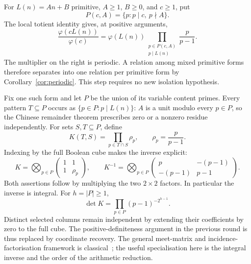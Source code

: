 \documentclass[11pt,a4paper]{article}
\theoremstyle{definition}\newtheorem{definition}[theorem]{Definition}
\theoremstyle{remark}\newtheorem*{remark}{Remark}
\newcommand{\ph}{\varphi}\newcommand{\Span}{\operatorname{span}}\newcommand{\ord}{\operatorname{ord}}
\begin{document}
For $L(n)=An+B$ primitive, $A\ge1$, $B\ge0$, and $c\ge1$, put
\[
 P(c,A)=\{p:p\mid c,\ p\nmid A\}.
\]
The local totient identity gives, at positive arguments,
\begin{equation}\label{eq:content}
 \frac{\ph(cL(n))}{\ph(c)}
 =\ph(L(n))\prod_{\substack{p\in P(c,A)\\p\mid L(n)}}\frac p{p-1}.
\end{equation}
The multiplier on the right is periodic. A relation among mixed primitive
forms therefore separates into one relation per primitive form by
Corollary~\ref{cor:periodic}. This step requires no new isolation hypothesis.

Fix one such form and let $P$ be the union of its variable content primes.
Every pattern $T\subseteq P$ occurs as $\{p\in P:p\mid L(n)\}$: $A$ is a unit
modulo every $p\in P$, so the Chinese remainder theorem prescribes zero or a
nonzero residue independently. For sets $S,T\subseteq P$, define
\[
 K(T,S)=\prod_{p\in T\cap S}\rho_p,\qquad \rho_p=\frac p{p-1}.
\]
Indexing by the full Boolean cube makes the inverse explicit:
\begin{equation}\label{eq:tensor}
 K=\bigotimes_{p\in P}
 \begin{pmatrix}1&1\\1&\rho_p\end{pmatrix},\qquad
 K^{-1}=\bigotimes_{p\in P}
 \begin{pmatrix}p&-(p-1)\\-(p-1)&p-1\end{pmatrix}.
\end{equation}
Both assertions follow by multiplying the two $2\times2$ factors.
In particular the inverse is integral. For $h=|P|\ge1$,
\[
 \det K=\prod_{p\in P}(p-1)^{-2^{h-1}}.
\]
Distinct selected columns remain independent by extending their coefficients
by zero to the full cube. The positive-definiteness argument in the previous
round is thus replaced by coordinate recovery. The general meet-matrix and
incidence-factorisation framework is classical~\cite{mattila}; the useful
specialisation here is the integral inverse and the order of the arithmetic
reduction.
\end{document}
